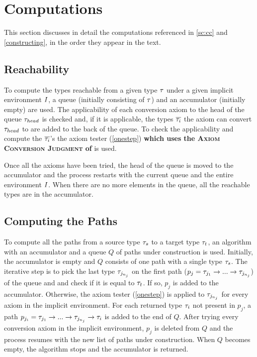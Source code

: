 \section{Computations}
\label{computations}
This section discusses in detail the computations referenced in \ref{sc:cc} and \ref{constructing}, in the order they appear in the text.

\subsection{Reachability}
\label{reachability}
To compute the types reachable from a given type $\mathit{\tau}$ under a given implicit environment $I$, a queue (initially consisting of $\mathit{\tau}$) and an accumulator (initially empty) are used. The applicability of each conversion axiom to the head of the queue $\mathit{\tau}_{head}$ is checked and, if it is applicable, the types $\overline{\mathit{\tau}_i}$ the axiom can convert $\mathit{\tau}_{head}$ to are added to the back of the queue. To check the applicability and compute the $\overline{\mathit{\tau}_i}$'s the axiom tester (\ref{onestep}) \textbf{ which uses the \textsc{Axiom Conversion Judgment} of } is used.

Once all the axioms have been tried, the head of the queue is moved to the accumulator and the process restarts with the current queue and the entire environment $I$. When there are no more elements in the queue, all the reachable types are in the accumulator.

\subsection{Computing the Paths}
\label{paths}
To compute all the paths from a source type $\mathit{\tau}_s$ to a target type $\mathit{\tau}_t$, an algorithm with an accumulator and a queue $Q$ of paths under construction is used. Initially, the accumulator is empty and $Q$ consists of one path with a single type $\mathit{\tau}_s$. The iterative step is to pick the last type $\mathit{\tau}_{j_{n_j}}$ on the first path ($p_j = \mathit{\tau}_{j_1}\to ... \to \mathit{\tau}_{j_{n_j}}$) of the queue and and check if it is equal to $\mathit{\tau}_t$. If so, $p_j$ is added to the accumulator. Otherwise, the axiom tester (\ref{onestep}) is applied to $\mathit{\tau}_{j_{n_j}}$ for every axiom in the implicit environment. For each returned type $\mathit{\tau}_i$ not present in $p_j$, a path $p_{j_i} = \mathit{\tau}_{j_1}\to ... \to \mathit{\tau}_{j_{n_j}} \to \mathit{\tau}_i$ is added to the end of $Q$. After trying every conversion axiom in the implicit environment, $p_j$ is deleted from $Q$ and the process resumes with the new list of paths under construction. When $Q$ becomes empty, the algorithm stops and the accumulator is returned.

